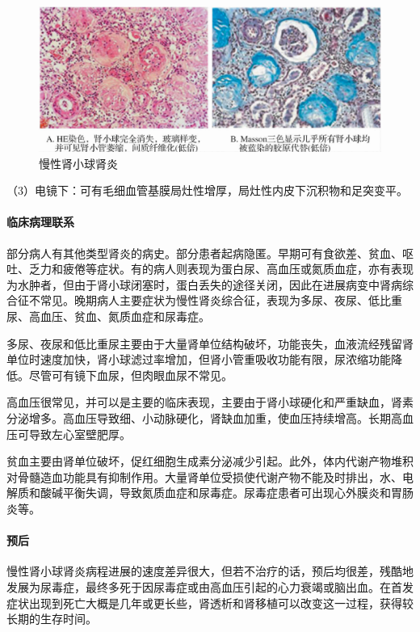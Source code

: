 \begin{figure}[!htbp]
 \centering
 \includegraphics{./images/Image00172.jpg}
 \captionsetup{justification=centering}
 \caption{慢性肾小球肾炎}
 \label{fig10-24}
  \end{figure} 

（3）电镜下：可有毛细血管基膜局灶性增厚，局灶性内皮下沉积物和足突变平。

\paragraph{临床病理联系}
部分病人有其他类型肾炎的病史。部分患者起病隐匿。早期可有食欲差、贫血、呕吐、乏力和疲倦等症状。有的病人则表现为蛋白尿、高血压或氮质血症，亦有表现为水肿者，但由于肾小球闭塞时，蛋白丢失的途径关闭，因此在进展病变中肾病综合征不常见。晚期病人主要症状为慢性肾炎综合征，表现为多尿、夜尿、低比重尿、高血压、贫血、氮质血症和尿毒症。

多尿、夜尿和低比重尿主要由于大量肾单位结构破坏，功能丧失，血液流经残留肾单位时速度加快，肾小球滤过率增加，但肾小管重吸收功能有限，尿浓缩功能降低。尽管可有镜下血尿，但肉眼血尿不常见。

高血压很常见，并可以是主要的临床表现，主要由于肾小球硬化和严重缺血，肾素分泌增多。高血压导致细、小动脉硬化，肾缺血加重，使血压持续增高。长期高血压可导致左心室壁肥厚。

贫血主要由肾单位破坏，促红细胞生成素分泌减少引起。此外，体内代谢产物堆积对骨髓造血功能具有抑制作用。大量肾单位受损使代谢产物不能及时排出，水、电解质和酸碱平衡失调，导致氮质血症和尿毒症。尿毒症患者可出现心外膜炎和胃肠炎等。

\paragraph{预后}
慢性肾小球肾炎病程进展的速度差异很大，但若不治疗的话，预后均很差，残酷地发展为尿毒症，最终多死于因尿毒症或由高血压引起的心力衰竭或脑出血。在首发症状出现到死亡大概是几年或更长些，肾透析和肾移植可以改变这一过程，获得较长期的生存时间。

